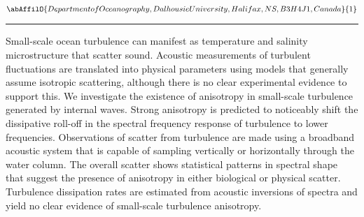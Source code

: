 \begin{center}
   \vspace{2 mm} \begin{center}
    \vspace{2 mm}\begin{center}
  
  $\abAffilO{Department of Oceanography, Dalhousie University, Halifax, NS, B3H 4J1, Canada}{1}$

  \end{center}
  \vspace{2 mm}
  \end{center}\end{center}
  \begin{center}\rule{0.70\linewidth}{0.5 pt}\end{center}

\noindent Small-scale ocean turbulence can manifest as temperature and salinity microstructure that scatter sound. Acoustic measurements of turbulent fluctuations are translated into physical parameters using models that generally assume isotropic scattering, although there is no clear experimental evidence to support this. We investigate the existence of anisotropy in small-scale turbulence generated by internal waves. Strong anisotropy is predicted to noticeably shift the dissipative roll-off in the spectral frequency response of turbulence to lower frequencies. Observations of scatter from turbulence are made using a broadband acoustic system that is capable of sampling vertically or horizontally through the water column. The overall scatter shows statistical patterns in spectral shape that suggest the presence of anisotropy in either biological or physical scatter. Turbulence dissipation rates are estimated from acoustic inversions of spectra and yield no clear evidence of small-scale turbulence anisotropy.

